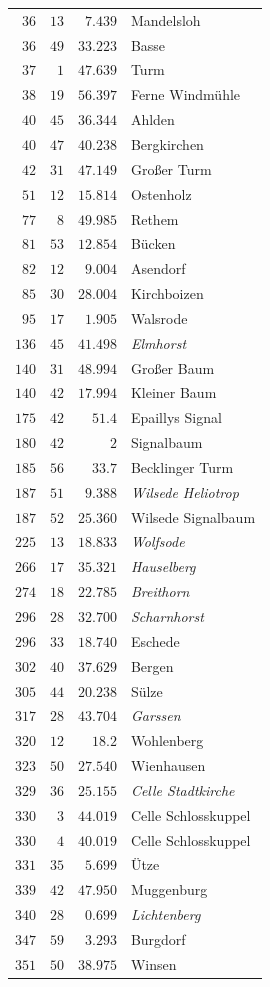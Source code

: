 \begin{longtable}{@{}rrrp{.61\linewidth}@{}}
\(36\)&\(13\)&\(7.439\)&\raggedright Mandelsloh\tabularnewline
\(36\)&\(49\)&\(33.223\)&\raggedright Basse\tabularnewline
\(37\)&\(1\)&\(47.639\)&\raggedright Turm\tabularnewline
\(38\)&\(19\)&\(56.397\)&\raggedright Ferne Windmühle\tabularnewline
\(40\)&\(45\)&\(36.344\)&\raggedright Ahlden\tabularnewline
\(40\)&\(47\)&\(40.238\)&\raggedright Bergkirchen\tabularnewline
\(42\)&\(31\)&\(47.149\)&\raggedright Großer Turm\tabularnewline
\(51\)&\(12\)&\(15.814\)&\raggedright Ostenholz\tabularnewline
\(77\)&\(8\)&\(49.985\)&\raggedright Rethem\tabularnewline
\(81\)&\(53\)&\(12.854\)&\raggedright Bücken\tabularnewline
\(82\)&\(12\)&\(9.004\)&\raggedright Asendorf\tabularnewline
\(85\)&\(30\)&\(28.004\)&\raggedright Kirchboizen\tabularnewline
\(95\)&\(17\)&\(1.905\)&\raggedright Walsrode\tabularnewline
\(136\)&\(45\)&\(41.498\)&\raggedright \textit{Elmhorst}\tabularnewline
\(140\)&\(31\)&\(48.994\)&\raggedright Großer Baum\tabularnewline
\(140\)&\(42\)&\(17.994\)&\raggedright Kleiner Baum\tabularnewline
\(175\)&\(42\)&\(51.4\)&\raggedright Epaillys Signal\tabularnewline
\(180\)&\(42\)&\(2\)&\raggedright Signalbaum\tabularnewline
\(185\)&\(56\)&\(33.7\)&\raggedright Becklinger Turm\tabularnewline
\(187\)&\(51\)&\(9.388\)&\raggedright \textit{Wilsede Heliotrop}\tabularnewline
\(187\)&\(52\)&\(25.360\)&\raggedright Wilsede Signalbaum\tabularnewline
\(225\)&\(13\)&\(18.833\)&\raggedright \textit{Wolfsode}\tabularnewline
\(266\)&\(17\)&\(35.321\)&\raggedright \textit{Hauselberg}\tabularnewline
\(274\)&\(18\)&\(22.785\)&\raggedright \textit{Breithorn}\tabularnewline
\(296\)&\(28\)&\(32.700\)&\raggedright \textit{Scharnhorst}\tabularnewline
\(296\)&\(33\)&\(18.740\)&\raggedright Eschede\tabularnewline
\(302\)&\(40\)&\(37.629\)&\raggedright Bergen\tabularnewline
\(305\)&\(44\)&\(20.238\)&\raggedright Sülze\tabularnewline
\(317\)&\(28\)&\(43.704\)&\raggedright \textit{Garssen}\tabularnewline
\(320\)&\(12\)&\(18.2\)&\raggedright Wohlenberg\tabularnewline
\(323\)&\(50\)&\(27.540\)&\raggedright Wienhausen\tabularnewline
\(329\)&\(36\)&\(25.155\)&\raggedright \textit{Celle Stadtkirche}\tabularnewline
\(330\)&\(3\)&\(44.019\)&\raggedright Celle Schlosskuppel\tabularnewline
\(330\)&\(4\)&\(40.019\)&\raggedright Celle Schlosskuppel\tabularnewline
\(331\)&\(35\)&\(5.699\)&\raggedright Ütze\tabularnewline
\(339\)&\(42\)&\(47.950\)&\raggedright Muggenburg\tabularnewline
\(340\)&\(28\)&\(0.699\)&\raggedright \textit{Lichtenberg}\tabularnewline
\(347\)&\(59\)&\(3.293\)&\raggedright Burgdorf\tabularnewline
\(351\)&\(50\)&\(38.975\)&\raggedright Winsen\tabularnewline
\end{longtable}
\endgroup
